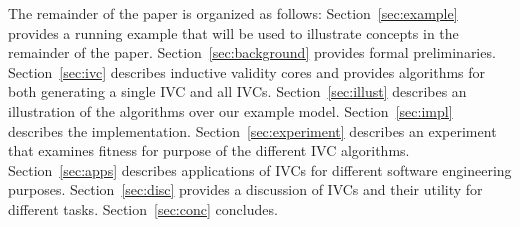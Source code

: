 The remainder of the paper is organized as follows: Section~\ref{sec:example} provides a running example that will be used to illustrate concepts in the remainder of the paper.  Section~\ref{sec:background} provides formal preliminaries.  Section~\ref{sec:ivc} describes inductive validity cores and provides algorithms for both generating a single IVC and all IVCs.  Section~\ref{sec:illust} describes an illustration of the algorithms over our example model.  Section~\ref{sec:impl} describes the implementation.  Section~\ref{sec:experiment} describes an experiment that examines fitness for purpose of the different IVC algorithms.  Section~\ref{sec:apps} describes applications of IVCs for different software engineering purposes.   Section~\ref{sec:disc} provides a discussion of IVCs and their utility for different tasks.  Section~\ref{sec:conc} concludes.

